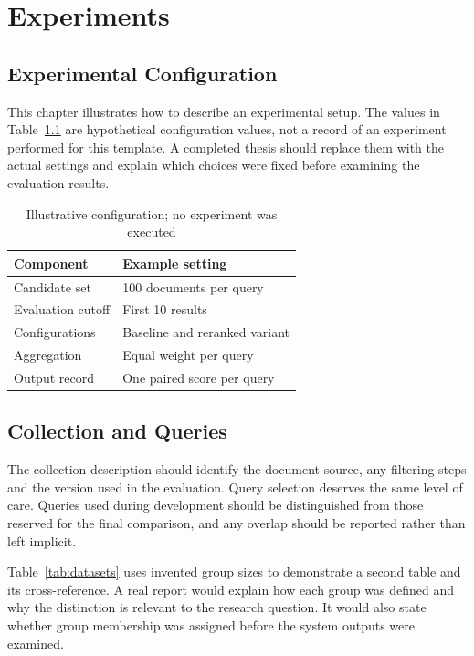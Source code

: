 \chapter{Experiments}
\label{sec:experiments}

\section{Experimental Configuration}
This chapter illustrates how to describe an experimental setup. The values
in Table~\ref{tab:environment} are hypothetical configuration values, not a
record of an experiment performed for this template. A completed thesis should
replace them with the actual settings and explain which choices were fixed
before examining the evaluation results.

\begin{table}[htbp]
  \centering
  \caption{Illustrative configuration; no experiment was executed}
  \label{tab:environment}
  \begin{tabular}{ll}\hline
    Component & Example setting\\\hline
    Candidate set & 100 documents per query\\
    Evaluation cutoff & First 10 results\\
    Configurations & Baseline and reranked variant\\
    Aggregation & Equal weight per query\\
    Output record & One paired score per query\\\hline
  \end{tabular}
\end{table}

\section{Collection and Queries}
The collection description should identify the document source, any filtering
steps and the version used in the evaluation. Query selection deserves the
same level of care. Queries used during development should be distinguished
from those reserved for the final comparison, and any overlap should be
reported rather than left implicit.

Table~\ref{tab:datasets} uses invented group sizes to demonstrate a second table
and its cross-reference. A real report would explain how each group was defined
and why the distinction is relevant to the research question. It would also
state whether group membership was assigned before the system outputs were
examined.

